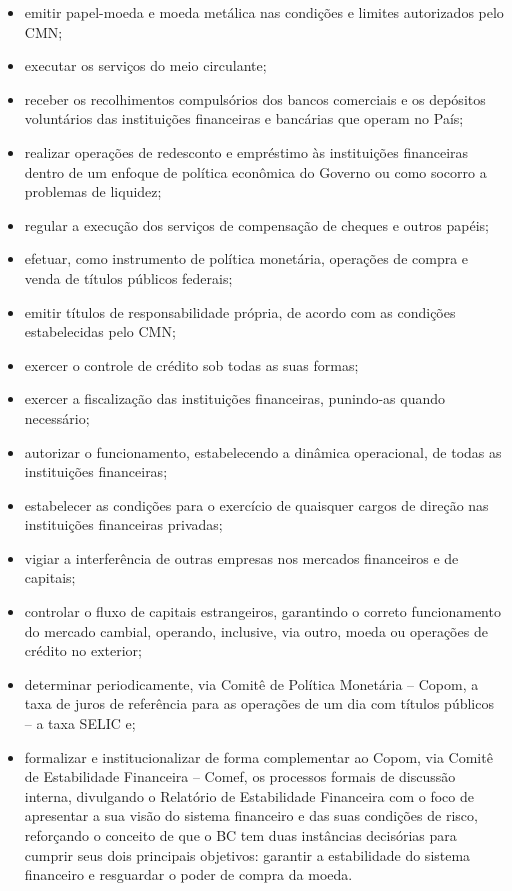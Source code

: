 \documentclass[
	10pt,				%
	openright,			%
	twoside,			%
	a5paper,			%
	english,			%
	french,				%
	spanish,			%
	brazil				%
	]{abntex2}
\begin{document}
\begin{itemize}
\tightlist
\item
  emitir papel-moeda e moeda metálica nas condições e limites
  autorizados pelo CMN;
\item
  executar os serviços do meio circulante;
\item
  receber os recolhimentos compulsórios dos bancos comerciais e os
  depósitos voluntários das instituições financeiras e bancárias que
  operam no País;
\item
  realizar operações de redesconto e empréstimo às instituições
  financeiras dentro de um enfoque de política econômica do Governo ou
  como socorro a problemas de liquidez;
\item
  regular a execução dos serviços de compensação de cheques e outros
  papéis;
\item
  efetuar, como instrumento de política monetária, operações de compra e
  venda de títulos públicos federais;
\item
  emitir títulos de responsabilidade própria, de acordo com as condições
  estabelecidas pelo CMN;
\item
  exercer o controle de crédito sob todas as suas formas;
\item
  exercer a fiscalização das instituições financeiras, punindo-as quando
  necessário;
\item
  autorizar o funcionamento, estabelecendo a dinâmica operacional, de
  todas as instituições financeiras;
\item
  estabelecer as condições para o exercício de quaisquer cargos de
  direção nas instituições financeiras privadas;
\item
  vigiar a interferência de outras empresas nos mercados financeiros e
  de capitais;
\item
  controlar o fluxo de capitais estrangeiros, garantindo o correto
  funcionamento do mercado cambial, operando, inclusive, via outro,
  moeda ou operações de crédito no exterior;
\item
  determinar periodicamente, via Comitê de Política Monetária -- Copom,
  a taxa de juros de referência para as operações de um dia com títulos
  públicos -- a taxa SELIC e;
\item
  formalizar e institucionalizar de forma complementar ao Copom, via
  Comitê de Estabilidade Financeira -- Comef, os processos formais de
  discussão interna, divulgando o Relatório de Estabilidade Financeira
  com o foco de apresentar a sua visão do sistema financeiro e das suas
  condições de risco, reforçando o conceito de que o BC tem duas
  instâncias decisórias para cumprir seus dois principais objetivos:
  garantir a estabilidade do sistema financeiro e resguardar o poder de
  compra da moeda.
\end{itemize}
\end{document}
